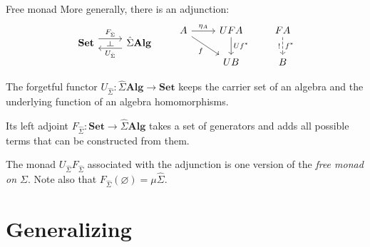\documentclass{beamer}
\newcommand{\cat}[1]{\mathbf{#1}}
\begin{document}
\begin{frame}[fragile]{Free monad} %
More generally, there is an adjunction:
\[
  \begin{tikzcd}
    \cat{Set}
    \arrow[r, "F_{\hat{\Sigma}}" name=F, shift left=2] &
    \hat{\Sigma} \cat{Alg}
    \arrow[l, "U_{\hat{\Sigma}}" name=G, shift left=2]
    \arrow[phantom, from=F, to=G, "\dashv" rotate=-90]
  \end{tikzcd}
  \qquad
  \begin{tikzcd}
    A \arrow[r, "\eta_A"] \arrow[rd, "f"'] &
    UFA \arrow[d, "U f^*"] &
    FA \arrow[d, "f^*", "!"', dashed] \\
    & U B & B
  \end{tikzcd}
\]
\pause

The forgetful functor
$U_{\hat{\Sigma}} : \hat{\Sigma} \cat{Alg} \rightarrow \cat{Set}$
keeps the carrier set of an algebra
and the underlying function of an algebra homomorphisms.
\pause

Its left adjoint
$F_{\hat{\Sigma}} : \cat{Set} \rightarrow \hat{\Sigma} \cat{Alg}$
takes a set of generators
and adds all possible terms that can be constructed from them.
\pause

The monad $U_{\hat{\Sigma}} F_{\hat{\Sigma}}$
associated with the adjunction
is one version of the \emph{free monad on $\Sigma$}.
Note also that $F_{\hat{\Sigma}}(\varnothing) = \mu \hat{\Sigma}$.
\end{frame}

\section{Generalizing}
\end{document}

